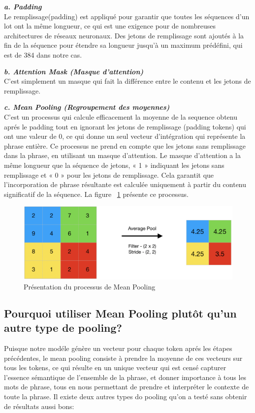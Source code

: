 \newpage
\noindent
{\small\textbf{\textit{a. Padding }}}\mbox{}\\
Le remplissage(padding) est appliqué pour garantir que toutes les séquences d'un lot ont la même longueur, ce qui est une exigence pour de nombreuses architectures de réseaux neuronaux. Des jetons de remplissage sont ajoutés à la fin de la séquence pour étendre sa longueur jusqu'à un maximum prédéfini, qui est de 384 dans notre cas.

\noindent
{\small\textbf{\textit{b. Attention Mask (Masque d'attention) }}}\mbox{}\\
C'est simplement un masque qui fait la différence entre le contenu et les jetons de remplissage.

\noindent
{\small\textbf{\textit{c. Mean Pooling (Regroupement des moyennes) }}}\mbox{}\\
C'est un processus qui calcule efficacement la moyenne de la sequence obtenu aprés le padding tout en ignorant les jetons de remplissage (padding tokens) qui ont une valeur de 0, ce qui donne un seul vecteur d'intégration qui représente la phrase entière.
Ce processus ne prend en compte que les jetons sans remplissage dans la phrase, en utilisant un masque d'attention. Le masque d'attention a la même longueur que la séquence de jetons, « 1 » indiquant les jetons sans remplissage et « 0 » pour les jetons de remplissage. Cela garantit que l'incorporation de phrase résultante est calculée uniquement à partir du contenu significatif de la séquence. La figure ~\ref{fig:meanpooling} présente ce processus.

\begin{figure}[H]
\centering
\includegraphics[width=1\textwidth]{logos/mean_pooling.png}
\caption{Présentation du processus de Mean Pooling}
\label{fig:meanpooling}
\end{figure}

\subsection{Pourquoi utiliser Mean Pooling plutôt qu'un autre type de pooling?}
\noindent
Puisque notre modéle génère un vecteur pour chaque token aprés les étapes précédentes, le mean pooling consiste à prendre la moyenne de ces vecteurs sur tous les tokens, ce qui résulte en un unique vecteur qui est censé capturer l'essence sémantique de l'ensemble de la phrase, et donner importance à tous les mots de phrase, tous en nous permettant de prendre et interpréter le contexte de toute la phrase. Il existe deux autres types do pooling qu'on a testé sans obtenir de résultats aussi bons:

